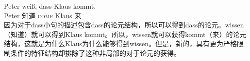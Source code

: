 \ea
\gll Peter weiß, dass Klaus kommt.\\
	 Peter 知道 \textsc{comp} Klaus 来\\
\z
因为对于dass小句的描述包含dass的论元结构，所以可以得到dass的论元。wissen（知道）就可以得到Klaus kommt。所以，wissen就可以获得kommt（来）的论元结构，这就是为什么Klaus为什么能够得到wissen。但是，新的，具有更为严格限制条件的特征结构却排除了这种非局部的对于论元的获得。

